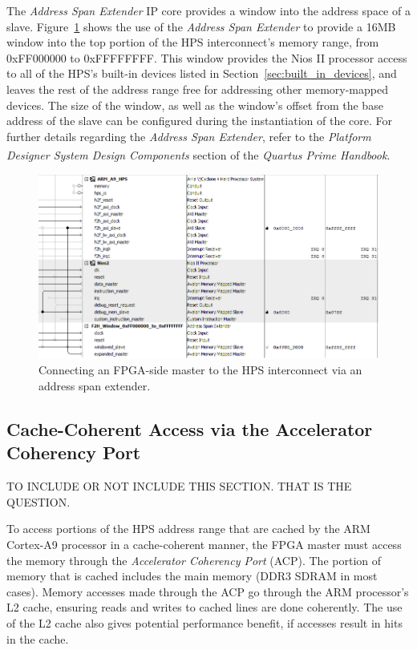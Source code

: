 \documentclass[11pt, twoside, pdftex]{article}
\begin{document}
The \textit{Address Span Extender} IP core provides a window into the address space of a slave. Figure~\ref{fig:nios_to_hps_via_addr_extender} shows the use of the \textit{Address Span Extender} to provide a 16MB window into the top portion of the HPS interconnect's memory range, from 0xFF000000 to 0xFFFFFFFF. This window provides the Nios II processor access to all of the HPS's built-in devices listed in Section~\ref{sec:built_in_devices}, and leaves the rest of the address range free for addressing other memory-mapped devices. The size of the window, as well as the window's offset from the base address of the slave can be configured during the instantiation of the core. For further details regarding the \textit{Address Span Extender}, refer to the \textit{Platform Designer System Design Components } section of the \textit{Quartus\textsuperscript{\textregistered} Prime Handbook}.

\begin{figure} [H]
\begin{center}
\includegraphics[scale = 0.5]{figures/fig_Nios_to_HPS_via_addr_extender.png}
\end{center}
\caption{Connecting an FPGA-side master to the HPS interconnect via an address span extender.}
\label{fig:nios_to_hps_via_addr_extender}
\end{figure}

\iffalse
\subsection{Cache-Coherent Access via the Accelerator Coherency Port}

TO INCLUDE OR NOT INCLUDE THIS SECTION. THAT IS THE QUESTION.

To access portions of the HPS address range that are cached by the ARM Cortex-A9 processor in a cache-coherent manner, the FPGA master must access the memory through the \textit{Accelerator Coherency Port} (ACP). The portion of memory that is cached includes the main memory (DDR3 SDRAM in most cases). Memory accesses made through the ACP go through the ARM processor's L2 cache, ensuring reads and writes to cached lines are done coherently. The use of the L2 cache also gives potential performance benefit, if accesses result in hits in the cache.
\end{document}
